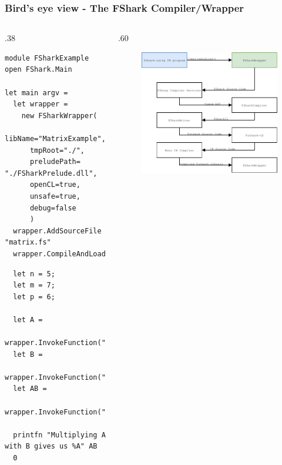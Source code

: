 \documentclass[10pt, compress, usenames, dvipsnames]{beamer}
\begin{document}
\begin{frame}[fragile]
  \frametitle{Bird's eye view - The FShark Compiler/Wrapper}
\begin{columns} %
\begin{column}{.38\textwidth}
\begin{verbatim}
module FSharkExample
open FShark.Main

let main argv =
  let wrapper = 
    new FSharkWrapper(
      libName="MatrixExample",
      tmpRoot="./",
      preludePath= "./FSharkPrelude.dll",
      openCL=true,
      unsafe=true,
      debug=false
      )
  wrapper.AddSourceFile "matrix.fs"
  wrapper.CompileAndLoad
\end{verbatim}
\begin{verbatim}
  let n = 5;
  let m = 7;
  let p = 6;

  let A =
    wrapper.InvokeFunction("replicateRows",n,m);
  let B = 
    wrapper.InvokeFunction("replicateRows",m,p);
  let AB = 
    wrapper.InvokeFunction("multiply",A,B);

  printfn "Multiplying A with B gives us %A" AB
  0
\end{verbatim}
\end{column}
\begin{column}{.60\textwidth}
  \begin{figure}
    \includegraphics[scale=0.7]{./images/pipeline/pipeline2}
  \end{figure}
\end{column}
\end{columns}
\end{frame}
\end{document}
